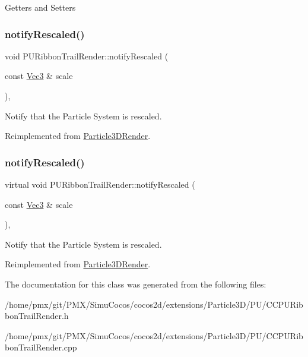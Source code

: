 Getters and Setters \mbox{\label{classPURibbonTrailRender_a84442c6a329c8a1318c35655e18fdf69}} 
\subsubsection{\texorpdfstring{notify\+Rescaled()}{notifyRescaled()}\hspace{0.1cm}{\footnotesize\ttfamily [1/2]}}
{\footnotesize\ttfamily void P\+U\+Ribbon\+Trail\+Render\+::notify\+Rescaled (\begin{DoxyParamCaption}\item[{const \hyperlink{classVec3}{Vec3} \&}]{scale }\end{DoxyParamCaption})\hspace{0.3cm}{\ttfamily [override]}, {\ttfamily [virtual]}}

Notify that the Particle System is rescaled. 

Reimplemented from \hyperlink{classParticle3DRender_a47e83d2bfea30ffbbaff7ff6526f5047}{Particle3\+D\+Render}.

\mbox{\label{classPURibbonTrailRender_aeb5cf442af12f6f2593f1b9020281577}} 
\subsubsection{\texorpdfstring{notify\+Rescaled()}{notifyRescaled()}\hspace{0.1cm}{\footnotesize\ttfamily [2/2]}}
{\footnotesize\ttfamily virtual void P\+U\+Ribbon\+Trail\+Render\+::notify\+Rescaled (\begin{DoxyParamCaption}\item[{const \hyperlink{classVec3}{Vec3} \&}]{scale }\end{DoxyParamCaption})\hspace{0.3cm}{\ttfamily [override]}, {\ttfamily [virtual]}}

Notify that the Particle System is rescaled. 

Reimplemented from \hyperlink{classParticle3DRender_a47e83d2bfea30ffbbaff7ff6526f5047}{Particle3\+D\+Render}.



The documentation for this class was generated from the following files\+:\begin{DoxyCompactItemize}
\item 
/home/pmx/git/\+P\+M\+X/\+Simu\+Cocos/cocos2d/extensions/\+Particle3\+D/\+P\+U/C\+C\+P\+U\+Ribbon\+Trail\+Render.\+h\item 
/home/pmx/git/\+P\+M\+X/\+Simu\+Cocos/cocos2d/extensions/\+Particle3\+D/\+P\+U/C\+C\+P\+U\+Ribbon\+Trail\+Render.\+cpp\end{DoxyCompactItemize}
